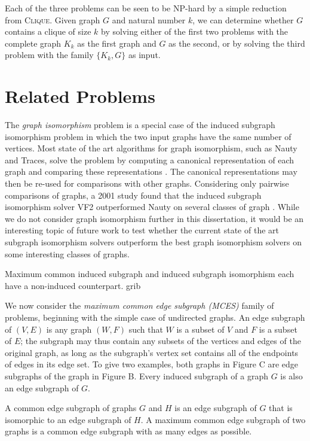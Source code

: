 Each of the three problems can be seen to be NP-hard by a simple reduction from \textsc{Clique}.
Given graph $G$ and natural number $k$, we can determine whether $G$ contains a clique
of size $k$ by solving either of the first two problems with the complete graph $K_k$ as
the first graph and $G$ as the second, or by solving the third problem with the family
$\{K_k, G\}$ as input.

\section{Related Problems}

The \emph{graph isomorphism} problem is a special case of the induced subgraph
isomorphism problem in which the two input graphs have the same number of
vertices.  Most state of the art algorithms for graph isomorphism, such as
Nauty and Traces, solve the problem by computing a canonical representation of
each graph and comparing these representations \citep{McKay201494}.  The
canonical representations may then be re-used for comparisons with other
graphs.  Considering only pairwise comparisons of graphs, a 2001 study found
that the induced subgraph isomorphism solver VF2 outperformed Nauty on several
classes of graph \citep{foggia2001performance}.  While we do not consider graph
isomorphism further in this dissertation, it would be an interesting topic of
future work to test whether the current state of the art subgraph isomorphism
solvers outperform the best graph isomorphism solvers on some interesting
classes of graphs.

Maximum common induced subgraph and induced subgraph isomorphism each have a non-induced
counterpart. grib

We now consider the \emph{maximum common edge subgraph (MCES)} family of problems,
beginning with the simple case of undirected graphs. An edge subgraph of $(V, E)$
is any graph $(W, F)$ such that $W$ is a subset of $V$ and $F$ is a subset of $E$; the
subgraph may thus contain any subsets of the vertices and edges of the original
graph, as long as the subgraph’s vertex set contains all of the endpoints of
edges in its edge set. To give two examples, both graphs in Figure C are edge
subgraphs of the graph in Figure B. Every induced subgraph of a graph $G$ is also
an edge subgraph of $G$.

A common edge subgraph of graphs $G$ and $H$ is an edge subgraph of $G$ that is
isomorphic to an edge subgraph of $H$. A maximum common edge subgraph of two
graphs is a common edge subgraph with as many edges as possible.

